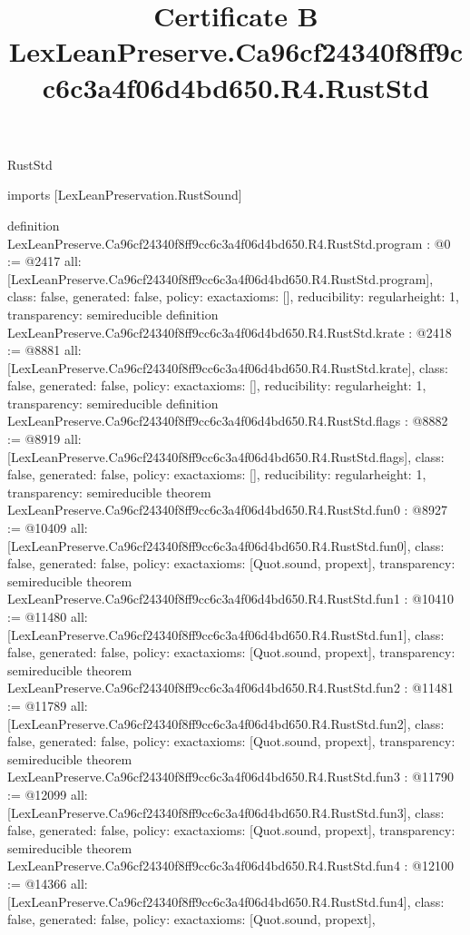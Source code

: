 \begin{lexlean}{RustStd}
\title{Certificate B LexLeanPreserve.Ca96cf24340f8ff9cc6c3a4f06d4bd650.R4.RustStd}
\begin{coremodule}
imports [LexLeanPreservation.RustSound]

definition LexLeanPreserve.Ca96cf24340f8ff9cc6c3a4f06d4bd650.R4.RustStd.program : @0 := @2417 {
  all: [LexLeanPreserve.Ca96cf24340f8ff9cc6c3a4f06d4bd650.R4.RustStd.program],
  class: false,
  generated: false,
  policy: exact{axioms: []},
  reducibility: regular{height: 1},
  transparency: semireducible
}
definition LexLeanPreserve.Ca96cf24340f8ff9cc6c3a4f06d4bd650.R4.RustStd.krate : @2418 := @8881 {
  all: [LexLeanPreserve.Ca96cf24340f8ff9cc6c3a4f06d4bd650.R4.RustStd.krate],
  class: false,
  generated: false,
  policy: exact{axioms: []},
  reducibility: regular{height: 1},
  transparency: semireducible
}
definition LexLeanPreserve.Ca96cf24340f8ff9cc6c3a4f06d4bd650.R4.RustStd.flags : @8882 := @8919 {
  all: [LexLeanPreserve.Ca96cf24340f8ff9cc6c3a4f06d4bd650.R4.RustStd.flags],
  class: false,
  generated: false,
  policy: exact{axioms: []},
  reducibility: regular{height: 1},
  transparency: semireducible
}
theorem LexLeanPreserve.Ca96cf24340f8ff9cc6c3a4f06d4bd650.R4.RustStd.fun0 : @8927 := @10409 {
  all: [LexLeanPreserve.Ca96cf24340f8ff9cc6c3a4f06d4bd650.R4.RustStd.fun0],
  class: false,
  generated: false,
  policy: exact{axioms: [Quot.sound, propext]},
  transparency: semireducible
}
theorem LexLeanPreserve.Ca96cf24340f8ff9cc6c3a4f06d4bd650.R4.RustStd.fun1 : @10410 := @11480 {
  all: [LexLeanPreserve.Ca96cf24340f8ff9cc6c3a4f06d4bd650.R4.RustStd.fun1],
  class: false,
  generated: false,
  policy: exact{axioms: [Quot.sound, propext]},
  transparency: semireducible
}
theorem LexLeanPreserve.Ca96cf24340f8ff9cc6c3a4f06d4bd650.R4.RustStd.fun2 : @11481 := @11789 {
  all: [LexLeanPreserve.Ca96cf24340f8ff9cc6c3a4f06d4bd650.R4.RustStd.fun2],
  class: false,
  generated: false,
  policy: exact{axioms: [Quot.sound, propext]},
  transparency: semireducible
}
theorem LexLeanPreserve.Ca96cf24340f8ff9cc6c3a4f06d4bd650.R4.RustStd.fun3 : @11790 := @12099 {
  all: [LexLeanPreserve.Ca96cf24340f8ff9cc6c3a4f06d4bd650.R4.RustStd.fun3],
  class: false,
  generated: false,
  policy: exact{axioms: [Quot.sound, propext]},
  transparency: semireducible
}
theorem LexLeanPreserve.Ca96cf24340f8ff9cc6c3a4f06d4bd650.R4.RustStd.fun4 : @12100 := @14366 {
  all: [LexLeanPreserve.Ca96cf24340f8ff9cc6c3a4f06d4bd650.R4.RustStd.fun4],
  class: false,
  generated: false,
  policy: exact{axioms: [Quot.sound, propext]},
}
\end{coremodule}
\end{lexlean}
